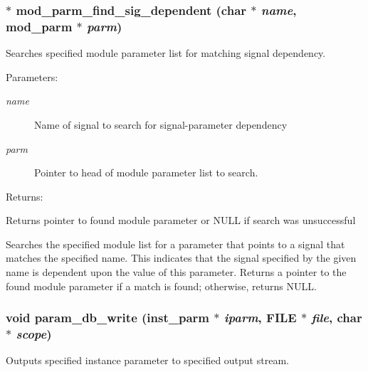 \subsubsection{$\ast$ mod\_\-parm\_\-find\_\-sig\_\-dependent (char $\ast$ {\em name}, {\bf mod\_\-parm} $\ast$ {\em parm})}\label{param_8c_a4}


Searches specified module parameter list for matching signal dependency.

\begin{Desc}
\item[Parameters: ]\par
\begin{description}
\item[{\em 
name}]Name of signal to search for signal-parameter dependency \item[{\em 
parm}]Pointer to head of module parameter list to search.\end{description}
\end{Desc}
\begin{Desc}
\item[Returns: ]\par
Returns pointer to found module parameter or NULL if search was unsuccessful\end{Desc}
Searches the specified module list for a parameter that points to a signal that matches the specified name. This indicates that the signal specified by the given name is dependent upon the value of this parameter. Returns a pointer to the found module parameter if a match is found; otherwise, returns NULL. 
\subsubsection{\setlength{\rightskip}{0pt plus 5cm}void param\_\-db\_\-write ({\bf inst\_\-parm} $\ast$ {\em iparm}, FILE $\ast$ {\em file}, char $\ast$ {\em scope})}\label{param_8c_a17}


Outputs specified instance parameter to specified output stream.

